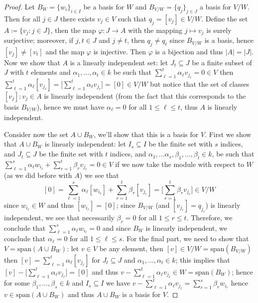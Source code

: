 \begin{proof}
Let \(B_W = \{w_i\}_{i \in I}\) be a basis for \(W\) and  \(B_{V/W} =
\{q_j\}_{j \in J}\) a basis for \(V/W\). Then for all \(j \in J\) there exists \(v_j
\in V\) such that \(q_j = [v_j] \in V/W\). Define the set \(A \coloneq \{v_j \colon j \in J\}\),
then the map \(\varphi : J \to A\) with the mapping \(j \mapsto v_j\) is
surely surjective; moreover, if \(j, t \in J\) and  \(j \neq t\), then \(q_j
\neq q_t\) since \(B_{V/W}\) is a basis, hence \([v_j] \neq [v_t]\) and the
map \(\varphi\) is injective. Then \(\varphi\) is a bijection and thus \(|A| =
|J|\). Now we show that \(A\) is a linearly independent set: let \(J_t
\subseteq J\) be a finite subset of \(J\) with \(t\) elements and \(\alpha_1,
\dots, \alpha_t \in k\) be such that \(\sum_{\ell=1}^t \alpha_\ell v_{j_\ell}
= 0 \in V\) then \(\sum_{\ell=1}^t \alpha_\ell [v_{j_\ell}] = \big[
\sum_{\ell=1}^t \alpha_\ell v_{j_\ell} \big] = [0] \in V/W\) but notice that
the set of classes \([v_j] : v_j \in A\) is linearly independent (from the
fact that this corresponds to the basis \(B_{V/W}\)), hence we must have
\(\alpha_\ell = 0\) for all \(1 \leq \ell \leq t\), thus \(A\) is linearly
independent.

Consider now the set \(A \cup B_W\), we'll show that this is a basis for
\(V\). First we show that \(A \cup B_W\) is linearly independent: let \(I_s
\subseteq I\) be the finite set with \(s\) indices, and \(J_t \subseteq J\) be
the finite set with \(t\) indices, and \(\alpha_1, \dots \alpha_s, \beta_1,
\dots, \beta_t \in k\), be such that \(\sum_{\ell=1}^s \alpha_\ell w_{i_\ell}
+ \sum_{r=1}^t \beta_r v_{j_r} = 0 \in V\) if we now take the module with
respect to \(W\) (as we did before with \(A\)) we see that
\[
  [0] = \sum_{\ell=1}^s\alpha_\ell [w_{i_\ell}]
  + \sum_{r=1}^t \beta_r [v_{j_r}] = \bigg[\sum_{r=1}^t \beta_r v_{j_r}\bigg]
  \in V/W
\]
since \(w_{i_\ell} \in W\) and thus \([w_{i_\ell}] = [0]\); since \(B_{V/W}\)
(and \([v_{j_r}] = q_{j_r}\)) is linearly independent, we see that
necessarily \(\beta_r = 0\) for all \(1 \leq r \leq t\). Therefore, we
conclude that \(\sum_{\ell=1}^s \alpha_\ell w_{i_\ell} = 0\) and since \(B_W\)
is linearly independent, we conclude that \(\alpha_{\ell} = 0\) for all  \(1
\leq \ell \leq s\). For the final part, we need to show that \(V =
\mathrm{span}(A \cup B_{W})\): let \(v \in V\) be any element, then \([v] \in
V/W = \mathrm{span}(B_{V/W})\) then \([v] = \sum_{\ell=1}^t \alpha_\ell
[v_{j_\ell}]\) for \(J_t \subseteq J\) and \(\alpha_1, \dots, \alpha_t \in
k\); this implies that \([v] - \big[ \sum_{\ell=1}^t \alpha_\ell v_{j_\ell}
\big] = [0]\) and thus \(v - \sum_{\ell=1}^t \alpha_\ell v_{j_\ell} \in W =
\mathrm{span}(B_{W})\); hence for some \(\beta_1, \dots, \beta_s \in k\) and
\(I_s \subseteq I\) we have \(v - \sum_{\ell=1}^t \alpha_\ell v_{j_\ell} =
\sum_{r=1}^s \beta_r w_{i_r}\) hence \(v \in \mathrm{span}(A \cup B_{W})\) and
thus \(A \cup B_W\) is a basis for \(V\).


\end{proof}
